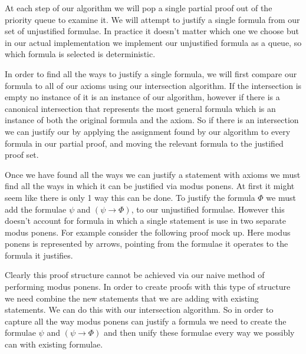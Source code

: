 \documentclass{article}
\begin{document}
At each step of our algorithm we will pop a single partial proof out of the priority queue to examine it.
We will attempt to justify a single formula from our set of unjustified formulae.
In practice it doesn't matter which one we choose but in our actual implementation we implement our unjustified formula as a queue, so which formula is selected is deterministic.

In order to find all the ways to justify a single formula, we will first compare our formula to all of our axioms using our intersection algorithm.
If the intersection is empty no instance of it is an instance of our algorithm, however if there is a canonical intersection that represents the most general formula
which is an instance of both the original formula and the axiom.
So if there is an intersection we can justify our by applying the assignment found by our algorithm to every formula in our partial proof, and moving the relevant formula to the justified proof set.

Once we have found all the ways we can justify a statement with axioms we must find all the ways in which it can be justified via modus ponens.
At first it might seem like there is only 1 way this can be done.
To justify the formula $\Phi$ we must add the formulae $\psi$ and $(\psi \rightarrow \Phi)$, to our unjustified formulae. 
However this doesn't account for formula in which a single statement is use in two separate modus ponens.
For example consider the following proof mock up.
Here modus ponens is represented by arrows, pointing from the formulae it operates to the formula it justifies.

\begin{center}
\end{center}

Clearly this proof structure cannot be achieved via our naive method of performing modus ponens.
In order to create proofs with this type of structure we need combine the new statements that we are adding with existing statements.
We can do this with our intersection algorithm.
So in order to capture all the way modus ponens can justify a formula we need to create the formulae $\psi$ and $(\psi\rightarrow\Phi)$ and then unify these formulae every way we possibly can with existing formulae.
\end{document}
